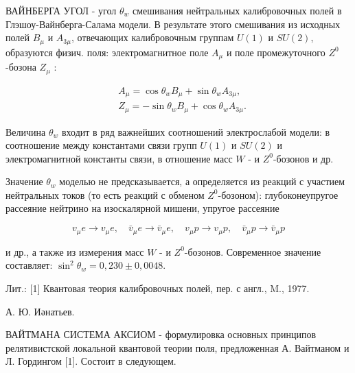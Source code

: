 \documentclass[10pt]{article}
\begin{document}
ВАЙНБЕРГА УГОЛ - угол $\theta_{w}$ смешивания нейтральных калибровочных полей в Глэшоу-Вайнберга-Салама модели. В результате этого смешивания из исходных полей $B_{\mu}$ и $A_{3 \mu}$, отвечающих калибровочным группам $U(1)$ и $S U(2)$, образуются физич. поля: электромагнитное поле $A_{\mu}$ и поле промежуточного $Z^{0}$-бозона $Z_{\mu}$ :



\[

\begin{aligned}

& A_{\mu}=\cos \theta_{w} B_{\mu}+\sin \theta_{w} A_{3 \mu}, \\

& Z_{\mu}=-\sin \theta_{w} B_{\mu}+\cos \theta_{w} A_{3 \mu} .

\end{aligned}

\]



Величина $\theta_{w}$ входит в ряд важнейших соотношений электрослабой модели: в соотношение между константами связи групп $U(1)$ и $S U(2)$ и электромагнитной константы связи, в отношение масс $W$ - и $Z^{0}$-бозонов и др.



Значение $\theta_{w}$ моделью не предсказывается, а определяется из реакций с участием нейтральных токов (то есть реакций с обменом $Z^{0}$-бозоном): глубоконеупругое рассеяние нейтрино на изоскалярной мишени, упругое рассеяние



\[

v_{\mu} e \rightarrow v_{\mu} e, \quad \bar{v}_{\mu} e \rightarrow \bar{v}_{\mu} e, \quad v_{\mu} p \rightarrow v_{\mu} p, \quad \bar{v}_{\mu} p \rightarrow \bar{v}_{\mu} p

\]



и др., а также из измерения масс $W$ - и $Z^{0}$-бозонов. Современное значение составляет: $\sin ^{2} \theta_{w}=0,230 \pm 0,0048$.



Лит.: [1] Квантовая теория калибровочных полей, пер. с англ., M., 1977.



А. Ю. Иәнатьев.



ВАЙТМАНА СИСТЕМА АКСИОМ - формулировка основных принципов релятивистской локальной квантовой теории поля, предложенная А. Вайтманом и Л. Гордингом [1]. Состоит в следующем.
\end{document}
